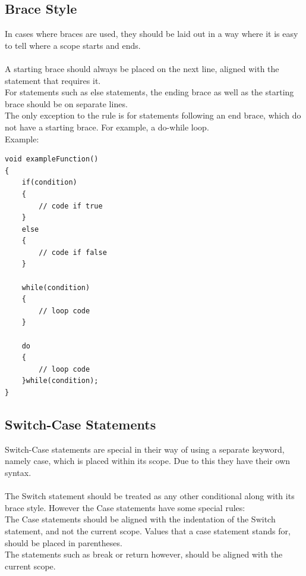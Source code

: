 \documentclass[12pt,article]{memoir}
\begin{document}
\newpage
\subsection{Brace Style}
\noindent
In cases where braces are used, they should be laid out in a way where it is easy to tell where a scope starts and ends.\\\\

\noindent
A starting brace should always be placed on the next line, aligned with the statement that requires it.\\

\noindent
For statements such as else statements, the ending brace as well as the starting brace should be on separate lines.\\

\noindent
The only exception to the rule is for statements following an end brace, which do not have a starting brace. For example, a do-while loop.\\

\noindent
Example:
\begin{lstlisting}
void exampleFunction()
{
	if(condition)
	{
		// code if true
	}
	else
	{
		// code if false
	}

	while(condition)
	{
		// loop code
	}	
	
	do
	{
		// loop code
	}while(condition);
}
\end{lstlisting}

\newpage
\subsection{Switch-Case Statements}
\noindent
Switch-Case statements are special in their way of using a separate keyword, namely case, which is placed within its scope. Due to this they have their own syntax.\\\\

\noindent
The Switch statement should be treated as any other conditional along with its brace style. However the Case statements have some special rules:\\

\noindent
The Case statements should be aligned with the indentation of the Switch statement, and not the current scope. Values that a case statement stands for, should be placed in parentheses.\\

\noindent
The statements such as break or return however, should be aligned with the current scope.\\
\end{document}
